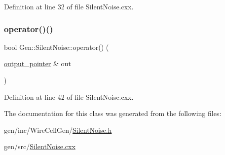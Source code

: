 Definition at line 32 of file Silent\+Noise.\+cxx.

\mbox{\label{class_wire_cell_1_1_gen_1_1_silent_noise_ac723376ec602f4b7391028e837219edd}} 
\subsubsection{\texorpdfstring{operator()()}{operator()()}}
{\footnotesize\ttfamily bool Gen\+::\+Silent\+Noise\+::operator() (\begin{DoxyParamCaption}\item[{\hyperlink{class_wire_cell_1_1_i_source_node_ae2743237513016d7f69d68aac1104951}{output\+\_\+pointer} \&}]{out }\end{DoxyParamCaption})\hspace{0.3cm}{\ttfamily [virtual]}}



Definition at line 42 of file Silent\+Noise.\+cxx.



The documentation for this class was generated from the following files\+:\begin{DoxyCompactItemize}
\item 
gen/inc/\+Wire\+Cell\+Gen/\hyperlink{_silent_noise_8h}{Silent\+Noise.\+h}\item 
gen/src/\hyperlink{_silent_noise_8cxx}{Silent\+Noise.\+cxx}\end{DoxyCompactItemize}

